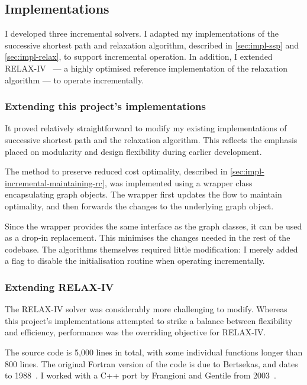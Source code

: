\subsection{Implementations} \label{sec:impl-incremental-impl}

I developed three incremental solvers. I adapted my implementations of the successive shortest path and relaxation algorithm, described in \cref{sec:impl-ssp} and \cref{sec:impl-relax}, to support incremental operation. In addition, I extended RELAX-IV~\cite{BertsekasCodes:1988,RelaxIV:2011} --- a highly optimised reference implementation of the relaxation algorithm --- to operate incrementally.

\subsubsection{Extending this project's implementations}
It proved relatively straightforward to modify my existing implementations of successive shortest path and the relaxation algorithm. This reflects the emphasis placed on modularity and design flexibility during earlier development.

The method to preserve reduced cost optimality, described in \cref{sec:impl-incremental-maintaining-rc}, was implemented using a wrapper class encapsulating graph objects. The wrapper first updates the flow to maintain optimality, and then forwards the changes to the underlying graph object.

Since the wrapper provides the same interface as the graph classes, it can be used as a drop-in replacement. This minimises the changes needed in the rest of the codebase. The algorithms themselves required little modification: I merely added a flag to disable the initialisation routine when operating incrementally.
 
\subsubsection{Extending RELAX-IV}
The RELAX-IV solver was considerably more challenging to modify. Whereas this project's implementations attempted to strike a balance between flexibility and efficiency, performance was the overriding objective for RELAX-IV. 

The source code is 5,000 lines in total, with some individual functions longer than 800 lines. The original Fortran version of the code is due to Bertsekas, and dates to 1988~\cite{BertsekasCodes:1988}. I worked with a C++ port by Frangioni and Gentile from 2003~\cite{RelaxIV:2011}.


